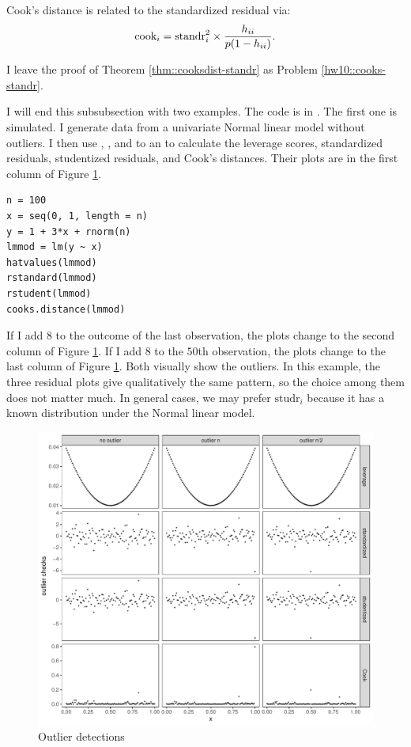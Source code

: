 \begin{theorem}\label{thm::cooksdist-standr}
Cook's distance is related to the standardized residual via:
\[
\textup{cook}_{i}=\textup{standr}_{i}^{2}\times\frac{h_{ii}}{p(1-h_{ii})}.
\]
\end{theorem}

I leave the proof of Theorem \ref{thm::cooksdist-standr}  as Problem \ref{hw10::cooks-standr}. 



I will end this subsubsection with two examples. The  code is in . The first one is simulated. 
I generate data from a univariate Normal linear model without outliers. I then use , ,  and  to an  to calculate the leverage scores, standardized residuals, studentized residuals, and Cook's distances. Their plots are in the first column of Figure \ref{fig::outlier-detections}. 
\begin{lstlisting}
n = 100
x = seq(0, 1, length = n)
y = 1 + 3*x + rnorm(n)
lmmod = lm(y ~ x)
hatvalues(lmmod)
rstandard(lmmod)
rstudent(lmmod)
cooks.distance(lmmod)
\end{lstlisting}
If I add $8$ to the outcome of the last observation, the plots change to the second column of Figure \ref{fig::outlier-detections}. If I add $8$ to the $50$th observation, the plots change to the last column of Figure \ref{fig::outlier-detections}. Both visually show the outliers. 
 In this example, the three residual plots give qualitatively the same pattern, so the choice among them does not matter much. In general cases, we may prefer $\text{studr}_{i}$ because it has a known distribution under the Normal linear model. 

\begin{figure}[ht]
\centering
\includegraphics[width = \textwidth]{figures/residual_diagnostics.pdf}
\caption{Outlier detections}\label{fig::outlier-detections}
\end{figure}




